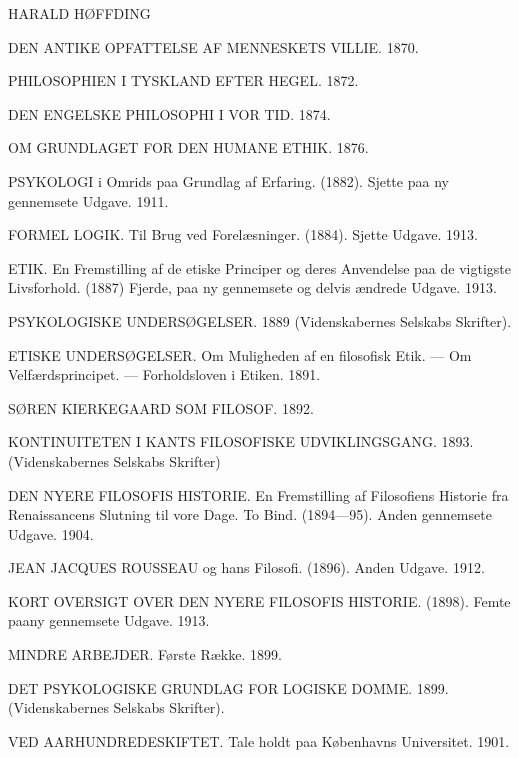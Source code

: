 \documentclass[12pt,a4paper,openany]{book}
\begin{document}
\frontmatter
\pagestyle{empty}

\begin{center}
{\large HARALD HØFFDING}
\end{center}
\medskip
{\footnotesize{}\setlength{\parindent}{0pt}\setlength{\parskip}{2pt}%
%
DEN ANTIKE OPFATTELSE AF MENNESKETS VILLIE. 1870.

PHILOSOPHIEN I TYSKLAND EFTER HEGEL. 1872.

DEN ENGELSKE PHILOSOPHI I VOR TID. 1874.

OM GRUNDLAGET FOR DEN HUMANE ETHIK. 1876.

PSYKOLOGI i Omrids paa Grundlag af Erfaring. (1882). Sjette paa ny gennemsete Udgave. 1911.

FORMEL LOGIK. Til Brug ved Forelæsninger. (1884). Sjette Udgave. 1913.

ETIK. En Fremstilling af de etiske Principer og deres Anvendelse paa de vigtigste Livsforhold. (1887) Fjerde, paa ny gennemsete og delvis ændrede Udgave. 1913.

PSYKOLOGISKE UNDERSØGELSER. 1889 (Videnskabernes Selskabs Skrifter).

ETISKE UNDERSØGELSER. Om Muligheden af en filosofisk Etik. --- Om Velfærdsprincipet. --- Forholdsloven i Etiken. 1891.

SØREN KIERKEGAARD SOM FILOSOF. 1892.

KONTINUITETEN I KANTS FILOSOFISKE UDVIKLINGSGANG. 1893. (Videnskabernes Selskabs Skrifter)

DEN NYERE FILOSOFIS HISTORIE. En Fremstilling af Filosofiens Historie fra Renaissancens Slutning til vore Dage. To Bind. (1894---95). Anden gennemsete Udgave. 1904.

JEAN JACQUES ROUSSEAU og hans Filosofi. (1896). Anden Udgave. 1912.

KORT OVERSIGT OVER DEN NYERE FILOSOFIS HISTORIE. (1898). Femte paany gennemsete Udgave. 1913.

MINDRE ARBEJDER. Første Række. 1899.

DET PSYKOLOGISKE GRUNDLAG FOR LOGISKE DOMME. 1899. (Videnskabernes Selskabs Skrifter).

VED AARHUNDREDESKIFTET. Tale holdt paa Københavns Universitet. 1901.

}
\end{document}
